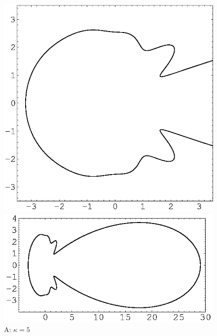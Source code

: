 \documentclass[12pt]{article}
\begin{document}
\begin{figure}[p]
\begin{center}
\includegraphics[scale=0.5]{./A2.eps}\includegraphics[scale=0.9]{./A1.eps}\\ 
{\footnotesize A: $\kappa=5$}\\
\vspace{2mm}

\end{center}
\end{figure}
\end{document}
